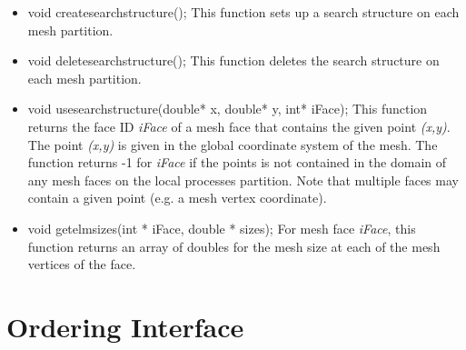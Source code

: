 \begin{itemize}
\item void createsearchstructure(); This function sets up a search structure on each mesh partition.  
\item void deletesearchstructure(); This function deletes the search structure on each mesh partition.
\item void usesearchstructure(double* x, double* y, int* iFace); This function returns the face ID \textit{iFace}
of a mesh face that contains the given point \textit{(x,y)}.  The point \textit{(x,y)} is given in the
global coordinate system of the mesh.  The function returns -1 for \textit{iFace} if the points is not contained
in the domain of any mesh faces on the local processes partition.  Note  that multiple faces may contain
a given point (e.g. a mesh vertex coordinate).
\item void getelmsizes(int * iFace, double * sizes); For mesh face \textit{iFace}, this function returns an array
of doubles for the mesh size at each of the mesh vertices of the face.  
\end{itemize}





\section{Ordering Interface}

